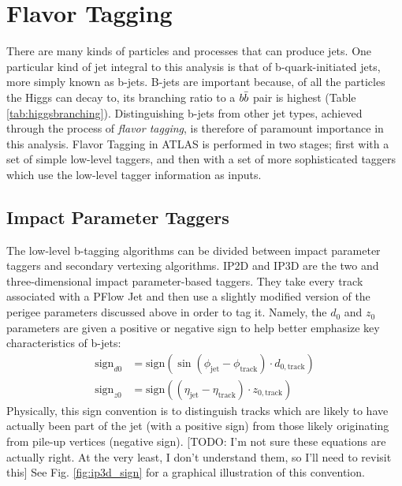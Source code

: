 
    \FloatBarrier
    \section{Flavor Tagging}
        
        There are many kinds of particles and processes that can produce jets.
        One particular kind of jet integral to this analysis is that of b-quark-initiated jets,
            more simply known as b-jets.
        B-jets are important because, of all the particles the Higgs can decay to,
            its branching ratio to a $b \bar{b}$ pair is highest (Table \ref{tab:higgsbranching}).
        Distinguishing b-jets from other jet types,
            achieved through the process of \textit{flavor tagging},
            is therefore of paramount importance in this analysis.
        Flavor Tagging in ATLAS is performed in two stages;
            first with a set of simple low-level taggers,
            and then with a set of more sophisticated taggers which use the low-level tagger information as inputs.


        \FloatBarrier
        \subsection{Impact Parameter Taggers}

            The low-level b-tagging algorithms can be divided between impact parameter taggers and secondary vertexing algorithms.
            IP2D and IP3D are the two and three-dimensional impact parameter-based taggers.
            They take every track associated with a PFlow Jet
                and then use a slightly modified version of the perigee parameters discussed above in order to tag it.
            Namely, the $d_0$ and $z_0$ parameters are given a positive or negative sign to help better emphasize key characteristics of b-jets\cite{thesis_giacinto}:
            \begin{equation} \begin{split}
                \textrm{sign}_{d0} &= \textrm{sign}(\sin(\phi_{\textrm{jet}} - \phi_{\textrm{track}}) \cdot d_{0,\textrm{track}}) \\
                \textrm{sign}_{z0} &= \textrm{sign}((\eta_{\textrm{jet}} - \eta_{\textrm{track}}) \cdot z_{0,\textrm{track}})
            \end{split} \end{equation}
            Physically, this sign convention is to distinguish tracks which are likely to have actually been part of the jet (with a positive sign)
                from those likely originating from pile-up vertices (negative sign).
            [TODO: I'm not sure these equations are actually right. At the very least, I don't understand them, so I'll need to revisit this]
            See Fig. \ref{fig:ip3d_sign} for a graphical illustration of this convention.

